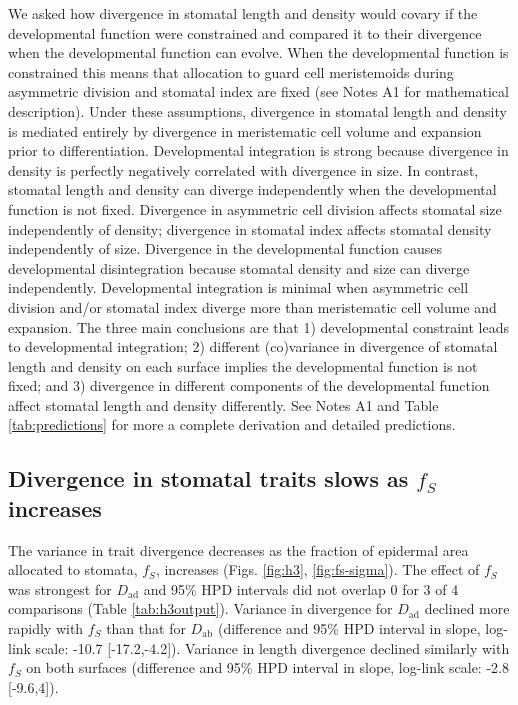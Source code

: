 \documentclass[
  12pt,
]{article}
\begin{document}
We asked how divergence in stomatal length and density would covary if the developmental function were constrained and compared it to their divergence when the developmental function can evolve. When the developmental function is constrained this means that allocation to guard cell meristemoids during asymmetric division and stomatal index are fixed (see Notes A1 for mathematical description). Under these assumptions, divergence in stomatal length and density is mediated entirely by divergence in meristematic cell volume and expansion prior to differentiation. Developmental integration is strong because divergence in density is perfectly negatively correlated with divergence in size. In contrast, stomatal length and density can diverge independently when the developmental function is not fixed. Divergence in asymmetric cell division affects stomatal size independently of density; divergence in stomatal index affects stomatal density independently of size. Divergence in the developmental function causes developmental disintegration because stomatal density and size can diverge independently. Developmental integration is minimal when asymmetric cell division and/or stomatal index diverge more than meristematic cell volume and expansion. The three main conclusions are that 1) developmental constraint leads to developmental integration; 2) different (co)variance in divergence of stomatal length and density on each surface implies the developmental function is not fixed; and 3) divergence in different components of the developmental function affect stomatal length and density differently. See Notes A1 and Table \ref{tab:predictions} for more a complete derivation and detailed predictions.

\hypertarget{divergence-in-stomatal-traits-slows-as-f_s-increases}{%
\subsection{\texorpdfstring{Divergence in stomatal traits slows as \(f_S\) increases}{Divergence in stomatal traits slows as f\_S increases}}\label{divergence-in-stomatal-traits-slows-as-f_s-increases}}

The variance in trait divergence decreases as the fraction of epidermal area allocated to stomata, \(f_S\), increases (Figs. \ref{fig:h3}, \ref{fig:fs-sigma}). The effect of \(f_S\) was strongest for \(D_\text{ad}\) and 95\% HPD intervals did not overlap 0 for 3 of 4 comparisons (Table \ref{tab:h3output}). Variance in divergence for \(D_\text{ad}\) declined more rapidly with \(f_S\) than that for \(D_\text{ab}\) (difference and 95\% HPD interval in slope, log-link scale: -10.7 {[}-17.2,-4.2{]}). Variance in length divergence declined similarly with \(f_S\) on both surfaces (difference and 95\% HPD interval in slope, log-link scale: -2.8 {[}-9.6,4{]}).
\end{document}
